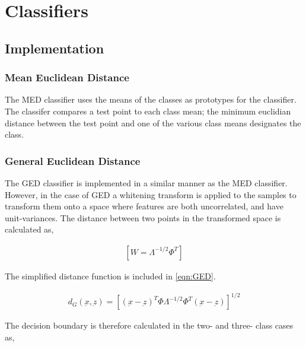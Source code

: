 \section{Classifiers}

\subsection{Implementation}

\subsubsection{Mean Euclidean Distance}

The MED classifier uses the means of the classes as prototypes for the classifier. The classifer compares a test point to each class mean; the minimum euclidian distance between the test point and one of the various class means designates the class.

\subsubsection{General Euclidean Distance}
The GED classifier is implemented in a similar manner as the MED classifier. However, in the case of GED a whitening transform is applied to the samples to transform them onto a space where features are both uncorrelated, and have unit-variances. The distance between two points in the transformed space is calculated as,


\begin{eqnarray}
\label{eqn:GED-whitening}
\left [ W=\Lambda^{-1/2}\Phi^{T}  \right ]
\end{eqnarray}



The simplified distance function is included in \ref{eqn:GED}.

\begin{eqnarray}
\label{eqn:GED}
{d}_{G}(\underbar{x},\underbar{z}) = {\left [ (\underbar{x}-\underbar{z})^{T}\Phi\Lambda^{-1/2}\Phi^{T}(\underbar{x}-\underbar{z}) \right ]}^{1/2}
\end{eqnarray}


The decision boundary is therefore calculated in the two- and three- class cases as,

